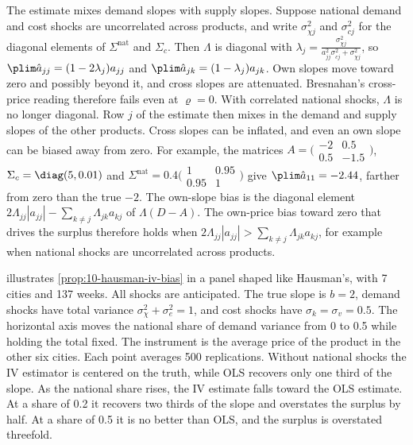 The estimate mixes demand slopes with supply slopes. Suppose national demand and cost shocks are uncorrelated
across products, and write $\sigma_{\chi j}^2$ and $\sigma_{cj}^2$ for the diagonal elements of
$\Sigma^{\mathrm{nat}}$ and $\Sigma_c$. Then $\Lambda$ is diagonal with
$\lambda_j = \frac{\sigma_{\chi j}^2}{a_{jj}^2\sigma_{cj}^2 + \sigma_{\chi j}^2}$, so
$\plim\hat a_{jj} = (1 - 2\lambda_j)a_{jj}$ and $\plim\hat a_{jk} = (1 - \lambda_j)a_{jk}$. Own slopes move
toward zero and possibly beyond it, and cross slopes are attenuated. Bresnahan's cross-price reading therefore
fails even at $\varrho = 0$. With correlated national shocks, $\Lambda$ is no longer diagonal. Row $j$ of the
estimate then mixes in the demand and supply slopes of the other products. Cross slopes can be inflated, and
even an own slope can be biased away from zero. For example, the matrices
$A = \bigl(\begin{smallmatrix}-2 & 0.5\\ 0.5 & -1.5\end{smallmatrix}\bigr)$, $\Sigma_c = \diag(5, 0.01)$ and
$\Sigma^{\mathrm{nat}} = 0.4\bigl(\begin{smallmatrix}1 & 0.95\\ 0.95 & 1\end{smallmatrix}\bigr)$ give
$\plim\hat a_{11} = -2.44$, farther from zero than the true $-2$. The own-slope bias is the diagonal element
$2\Lambda_{jj}|a_{jj}| - \sum_{k\neq j}\Lambda_{jk}a_{kj}$ of $\Lambda(D - A)$. The own-price bias toward zero
that drives the surplus therefore holds when $2\Lambda_{jj}|a_{jj}| > \sum_{k\neq j}\Lambda_{jk}a_{kj}$, for
example when national shocks are uncorrelated across products.

 illustrates \cref{prop:10-hausman-iv-bias} in a panel shaped like Hausman's,
with 7 cities and 137 weeks. All shocks are anticipated. The true slope is $b = 2$, demand shocks have
total variance $\sigma_\chi^2 + \sigma_e^2 = 1$, and cost shocks have $\sigma_k = \sigma_v = 0.5$. The
horizontal axis moves the national share of demand variance from 0 to 0.5 while holding the total fixed. The
instrument is the average price of the product in the other six cities. Each point averages 500
replications. Without national shocks the IV estimator is centered on the truth, while OLS recovers only one
third of the slope. As the national share rises, the IV estimate falls toward the OLS estimate. At a share
of 0.2 it recovers two thirds of the slope and overstates the surplus by half. At a share of 0.5 it is no
better than OLS, and the surplus is overstated threefold.

